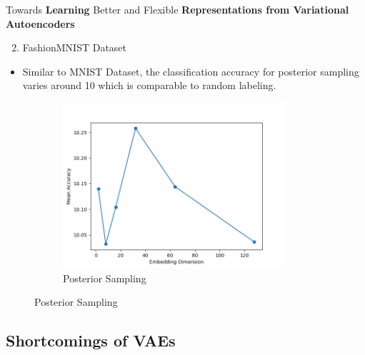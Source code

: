 \documentclass[hyperref={colorlinks,citecolor=blue,linkcolor=blue,urlcolor=blue}]{beamer}
\begin{document}
\begin{frame}{ Towards \textbf{Learning} Better and Flexible \textbf{Representations from Variational Autoencoders} \vspace{0.3em}}
  \begin{enumerate}
    \setcounter{enumi}{1}
    \item FashionMNIST Dataset
  \end{enumerate}
  \begin{itemize}
    \item Similar to MNIST Dataset, the classification accuracy for posterior sampling varies around 10 which is comparable to random labeling.
  \end{itemize}
  \begin{figure}
    \begin{subfigure}[b]{0.4\textwidth}
        \centering
        \includegraphics[width=0.9\textwidth,]{./Images/FashionMNIST_VAE_sampling.png}
        \caption{Posterior Sampling}
    \end{subfigure}
  \end{figure}
\end{frame}

\subsection{Shortcomings of VAEs}
\end{document}
